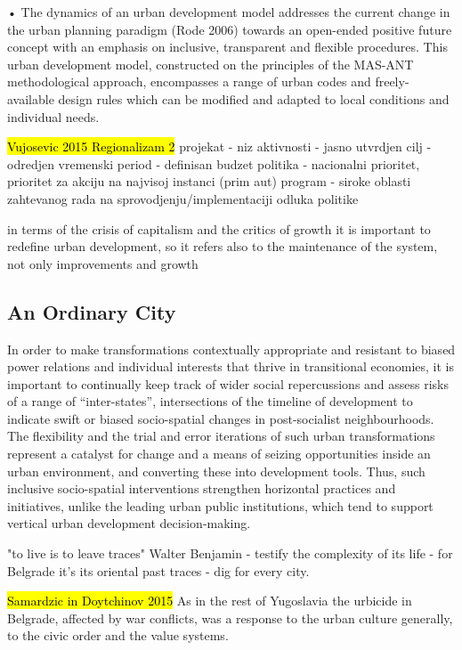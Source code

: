 \documentclass[11pt]{report}
\begin{document}
•	The dynamics of an urban development model addresses the current change in the urban planning paradigm (Rode 2006) towards an open-ended positive future concept with an emphasis on inclusive, transparent and flexible procedures. This urban development model, constructed on the principles of the MAS-ANT methodological approach, encompasses a range of urban codes and freely-available design rules which can be modified and adapted to local conditions and individual needs.

\hl{Vujosevic 2015 Regionalizam 2}
projekat - niz aktivnosti - jasno utvrdjen cilj - odredjen vremenski period - definisan budzet
politika - nacionalni prioritet, prioritet za akciju na najvisoj instanci (prim aut)
program - siroke oblasti zahtevanog rada na sprovodjenju/implementaciji odluka politike

in terms of the crisis of capitalism and the critics of growth it is important to redefine urban development, so it refers also to the maintenance of the system, not only improvements and growth

\subsection{An Ordinary City}

In order to make transformations contextually appropriate and resistant to biased power relations and individual interests that thrive in transitional economies, it is important to continually keep track of wider social repercussions and assess risks of a range of “inter-states”, intersections of the timeline of development to indicate swift or biased socio-spatial changes in post-socialist neighbourhoods. The flexibility and the trial and error iterations of such urban transformations represent a catalyst for change and a means of seizing opportunities inside an urban environment, and converting these into development tools. Thus, such inclusive socio-spatial interventions strengthen horizontal practices and initiatives, unlike the leading urban public institutions, which tend to support vertical urban development decision-making. 

"to live is to leave traces" Walter Benjamin - testify the complexity of its life - for Belgrade it's its oriental past traces - dig for every city.

\hl{Samardzic in Doytchinov 2015} 
As in the rest of Yugoslavia the urbicide in  Belgrade,  affected  by  war  conflicts,  was  a  response  to  the  urban  culture generally, to the civic order and the value systems.
\end{document}

